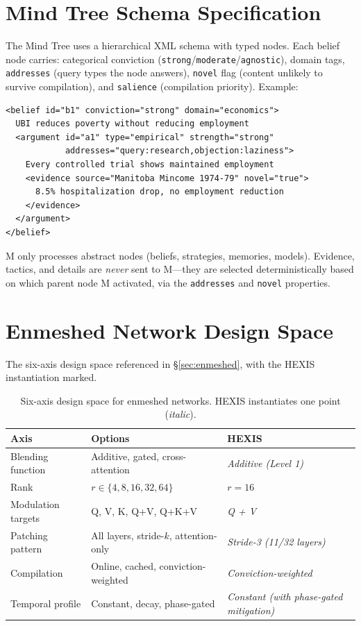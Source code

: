 \section{Mind Tree Schema Specification}
\label{sec:mind_tree_spec}

The Mind Tree uses a hierarchical XML schema with typed nodes. Each belief node carries: categorical conviction (\texttt{strong}/\texttt{moderate}/\texttt{agnostic}), domain tags, \texttt{addresses} (query types the node answers), \texttt{novel} flag (content unlikely to survive compilation), and \texttt{salience} (compilation priority). Example:

\begin{verbatim}
<belief id="b1" conviction="strong" domain="economics">
  UBI reduces poverty without reducing employment
  <argument id="a1" type="empirical" strength="strong"
            addresses="query:research,objection:laziness">
    Every controlled trial shows maintained employment
    <evidence source="Manitoba Mincome 1974-79" novel="true">
      8.5% hospitalization drop, no employment reduction
    </evidence>
  </argument>
</belief>
\end{verbatim}

M only processes abstract nodes (beliefs, strategies, memories, models). Evidence, tactics, and details are \emph{never} sent to M---they are selected deterministically based on which parent node M activated, via the \texttt{addresses} and \texttt{novel} properties.

\section{Enmeshed Network Design Space}
\label{sec:design_space_table}

The six-axis design space referenced in \S\ref{sec:enmeshed}, with the HEXIS instantiation marked.

\begin{table}[!ht]
\centering
\small
\caption{Six-axis design space for enmeshed networks. HEXIS instantiates one point (\emph{italic}).}
\label{tab:design_space}
\begin{tabular}{lll}
\toprule
\textbf{Axis} & \textbf{Options} & \textbf{HEXIS} \\
\midrule
Blending function & Additive, gated, cross-attention & \emph{Additive (Level 1)} \\
Rank & $r \in \{4, 8, 16, 32, 64\}$ & \emph{$r = 16$} \\
Modulation targets & Q, V, K, Q+V, Q+K+V & \emph{Q + V} \\
Patching pattern & All layers, stride-$k$, attention-only & \emph{Stride-3 (11/32 layers)} \\
Compilation & Online, cached, conviction-weighted & \emph{Conviction-weighted} \\
Temporal profile & Constant, decay, phase-gated & \emph{Constant (with phase-gated mitigation)} \\
\bottomrule
\end{tabular}
\end{table}


